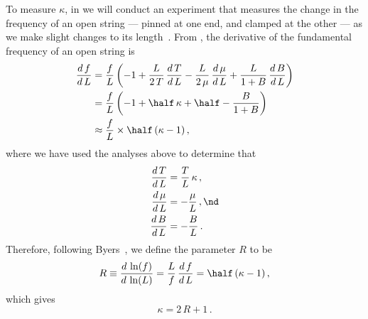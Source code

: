 To measure $\kappa$, in  we will conduct an experiment that measures the change in the frequency of an open string --- pinned at one end, and clamped at the other --- as we make slight changes to its length~\cite{ref:byers1996cgi,ref:varieschi2010icf}. From , the derivative of the fundamental frequency of an open string is
 \begin{equation}
 \begin{split}
\frac{d\, f}{d\, L} &= \frac{f}{L} \left( -1 + \frac{L}{2\, T}\, \frac{d\, T}{d\, L} - \frac{L}{2\, \mu}\, \frac{d\, \mu}{d\, L} + \frac{L}{1 + B}\, \frac{d\, B}{d\, L} \right) \\
&= \frac{f}{L} \left( -1 + \half\, \kappa + \half - \frac{B}{1 + B} \right) \\
&\approx \frac{f}{L} \times \half\, (\kappa - 1)\, ,
 \end{split}
 \end{equation}
where we have used the analyses above to determine that
 \begin{subequations}
 \begin{align}
\frac{d\, T}{d\, L} &= \frac{T}{L}\, \kappa\, , \\
\frac{d\, \mu}{d\, L} &= -\frac{\mu}{L}\, , \nd \\
\frac{d\, B}{d\, L} &= -\frac{B}{L}\, . \\
 \end{align}
 \end{subequations}
Therefore, following Byers~\cite{ref:byers1996cgi,ref:varieschi2010icf}, we define the parameter $R$ to be
 \begin{equation}\label{eqn:r_def}
R \equiv \frac{d\, \ln(f)}{d\, \ln(L)} = \frac{L}{f}\, \frac{d\, f}{d\, L} = \half\, (\kappa - 1)\, ,
 \end{equation}
which gives
 \begin{equation} \label{eqn:kappa_r}
\kappa = 2\, R + 1\, .
 \end{equation}

